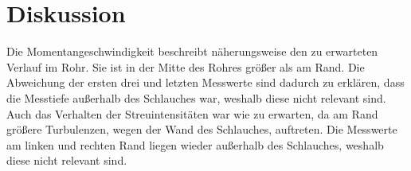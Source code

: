 \section{Diskussion}
\label{sec:Diskussion}

Die Momentangeschwindigkeit beschreibt näherungsweise den zu erwarteten Verlauf im Rohr. Sie ist in der Mitte des Rohres größer als am Rand. Die Abweichung der ersten drei und letzten
Messwerte sind dadurch zu erklären, dass die Messtiefe außerhalb des Schlauches war, weshalb diese nicht relevant sind.
Auch das Verhalten der Streuintensitäten war wie zu erwarten, da am Rand größere Turbulenzen, wegen der Wand des Schlauches, auftreten. Die Messwerte am linken und rechten Rand liegen
wieder außerhalb des Schlauches, weshalb diese nicht relevant sind.
